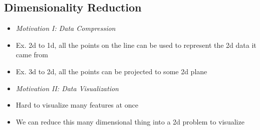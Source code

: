 \documentclass[]{article}
\begin{document}
	\subsection{Dimensionality Reduction}
		\begin{itemize}
			\item \emph{Motivation I: Data Compression}
			\item Ex. 2d to 1d, all the points on the line can be used to represent the 2d data it came from
			\item Ex. 3d to 2d, all the points can be projected to some 2d plane
			\item \emph{Motivation II: Data Visualization}
			\item Hard to visualize many features at once
			\item We can reduce this many dimensional thing into a 2d problem to visualize
		\end{itemize}
		
\end{document}
